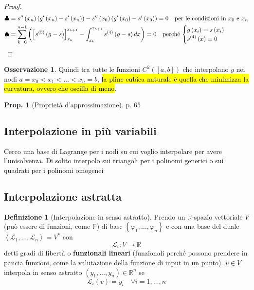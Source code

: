 \documentclass[a4paper,10pt]{article}
\theoremstyle{definition}
\newcommand{\re}{\mathbb{R}} %
\theoremstyle{indentdefinition}
\newtheorem{defn}{Definizione}[section]
\theoremstyle{indenttheorem}
\newtheorem{prop}{Prop.}
\theoremstyle{myremark}
\newtheorem*{rem*}{Osservazione}
\theoremstyle{indentgeneral}
\theoremstyle{plain}
\theoremstyle{plain}
\begin{document}
\begin{proof}
\begin{align*}
\clubsuit & =s^{\prime\prime}\left(x_{n}\right)\left(g^{\prime}\left(x_{n}\right)-s^{\prime}\left(x_{n}\right)\right)-s^{\prime\prime}\left(x_{0}\right)\left(g^{\prime}\left(x_{0}\right)-s^{\prime}\left(x_{0}\right)\right)=0\quad\text{per le condizioni in \ensuremath{x_{0}} e \ensuremath{x_{n}}}\\
\spadesuit & =\sum_{k=0}^{n-1}\left(\left[s^{(3)}\left(g-s\right)\right]_{x_{k}}^{x_{k+1}}-\int_{x_{k}}^{x_{k+1}}s^{(4)}\left(g-s\right)dx\right)=0\quad\text{perché \ensuremath{\begin{cases}
g\left(x_{i}\right)=s\left(x_{i}\right)\\
s^{(4)}\left(x\right)\equiv0
\end{cases}}}
\end{align*}
\end{proof}

\begin{rem*}
    Quindi tra tutte le funzioni $C^2([a,b])$ che interpolano $g$ nei nodi $a=x_0<x_1<\dots<x_n=b$, \hl{la pline cubica naturale è quella che minimizza la curvatura, ovvero che oscilla di meno}.
\end{rem*}

\begin{prop}[Proprietà d'approssimazione]
    p. 65
\end{prop}

\subsection{Interpolazione in più variabili}

Cerco una base di Lagrange per i nodi su cui voglio interpolare per
avere l'unisolvenza. Di solito interpolo sui triangoli per i polinomi
generici o sui quadrati per i polinomi omogenei

\subsection{Interpolazione astratta}
\begin{defn}[Interpolazione in senso astratto]
Prendo un $\mathbb{R}$-spazio vettoriale $V$ (può essere di funzioni, come $\mathbb{P}$) di base $\left\{ \varphi_{1},\ldots,\varphi_{n}\right\} $
e con una base del duale $\left\langle \mathscr{L}_{1},\ldots,\mathscr{L}_{n}\right\rangle =V^{*}$
con $$\mathscr{L}_{i}:V\to\re$$ detti gradi di libertà o \textbf{funzionali lineari} (funzionali perché possono prendere in pancia funzioni, come la valutazione della funzione di input in un punto). $v\in V$ interpola in
senso astratto $\left(y_{1},\ldots,y_{n}\right)\in \re^n$ se $$\mathscr{L}_{i}\left(v\right)=y_{i}\quad \forall i=1,\ldots,n$$
\end{defn}
\end{document}

